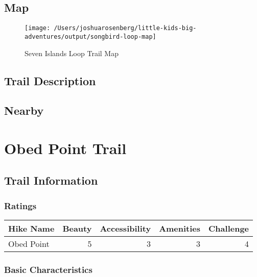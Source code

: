 \documentclass[
]{book}
\begin{document}
\hypertarget{map-6}{%
\section{Map}\label{map-6}}

\begin{figure}
\texttt{[image: /Users/joshuarosenberg/little-kids-big-adventures/output/songbird-loop-map]} \caption{Seven Islands Loop Trail Map}\label{fig:unnamed-chunk-21}
\end{figure}

\hypertarget{trail-description-6}{%
\section{Trail Description}\label{trail-description-6}}

\hypertarget{nearby-6}{%
\section{Nearby}\label{nearby-6}}

\hypertarget{obed-point-trail}{%
\chapter{Obed Point Trail}\label{obed-point-trail}}

\hypertarget{trail-information-7}{%
\section{Trail Information}\label{trail-information-7}}

\hypertarget{ratings-2}{%
\subsection{Ratings}\label{ratings-2}}

\begin{tabular}{l|r|r|r|r}
\hline
Hike Name & Beauty & Accessibility & Amenities & Challenge\\
\hline
Obed Point & 5 & 3 & 3 & 4\\
\hline
\end{tabular}

\hypertarget{basic-characteristics-7}{%
\subsection{Basic Characteristics}\label{basic-characteristics-7}}
\end{document}
